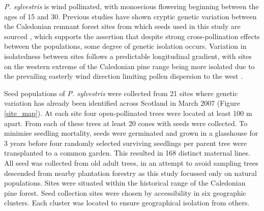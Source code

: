 \documentclass[a4paper, 11pt]{article}
\begin{document}
\textit{P. sylvestris} is wind pollinated, with monoecious flowering beginning between the ages of 15 and 30. Previous studies have shown cryptic genetic variation between the Caledonian remnant forest sites from which seeds used in this study are sourced \citep{Donnelly2018}, which supports the assertion that despite strong cross-pollination effects between the populations, some degree of genetic isolation occurs. Variation in isolatedness between sites follows a predictable longitudinal gradient, with sites on the western extreme of the Caledonian pine range being more isolated due to the prevailing easterly wind direction limiting pollen dispersion to the west \citep{Gonzalez2018}. 

Seed populations of \textit{P. sylvestris} were collected from 21 sites where genetic variation has already been identified across Scotland in March 2007 (Figure \ref{site_map}). At each site four open-pollinated trees were located at least 100 m apart. From each of these trees at least 20 cones with seeds were collected. To minimise seedling mortality, seeds were germinated and grown in a glasshouse for 3 years before four randomly selected surviving seedlings per parent tree were transplanted to a common garden. This resulted in 168 distinct maternal lines. All seed was collected from old adult trees, in an attempt to avoid sampling trees descended from nearby plantation forestry as this study focussed only on natural populations. Sites were situated within the historical range of the Caledonian pine forest. Seed collection sites were chosen by accessibility in six geographic clusters. Each cluster was located to ensure geographical isolation from others. 
\end{document}
